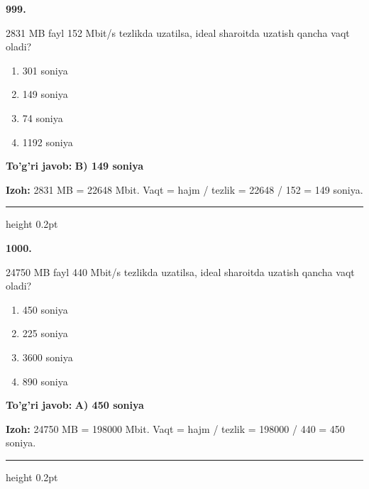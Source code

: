 \documentclass[10pt,a4paper,oneside]{article}
\begin{document}
\noindent\textbf{\color{ink}999.}
\par
2831 MB fayl 152 Mbit/s tezlikda uzatilsa, ideal sharoitda uzatish qancha vaqt oladi?
\begin{enumerate}[label=\Alph*),leftmargin=9mm]
\item 301 soniya
\item 149 soniya
\item 74 soniya
\item 1192 soniya
\end{enumerate}
\begin{tcolorbox}[enhanced,breakable,colback=teal!4,colframe=teal!50!black,boxrule=0.5pt,arc=1.1mm,left=3mm,right=3mm,top=1.7mm,bottom=1.7mm,before skip=2mm,after skip=2mm]
\textbf{\color{teal}To'g'ri javob:} \textbf{B) 149 soniya}
\par\smallskip
\textbf{Izoh:} 2831 MB = 22648 Mbit. Vaqt = hajm / tezlik = 22648 / 152 = 149 soniya.
\end{tcolorbox}
\vspace{2mm}\hrule height 0.2pt \vspace{3mm}

\noindent\textbf{\color{ink}1000.}
\par
24750 MB fayl 440 Mbit/s tezlikda uzatilsa, ideal sharoitda uzatish qancha vaqt oladi?
\begin{enumerate}[label=\Alph*),leftmargin=9mm]
\item 450 soniya
\item 225 soniya
\item 3600 soniya
\item 890 soniya
\end{enumerate}
\begin{tcolorbox}[enhanced,breakable,colback=teal!4,colframe=teal!50!black,boxrule=0.5pt,arc=1.1mm,left=3mm,right=3mm,top=1.7mm,bottom=1.7mm,before skip=2mm,after skip=2mm]
\textbf{\color{teal}To'g'ri javob:} \textbf{A) 450 soniya}
\par\smallskip
\textbf{Izoh:} 24750 MB = 198000 Mbit. Vaqt = hajm / tezlik = 198000 / 440 = 450 soniya.
\end{tcolorbox}
\vspace{2mm}\hrule height 0.2pt \vspace{3mm}
\end{document}
